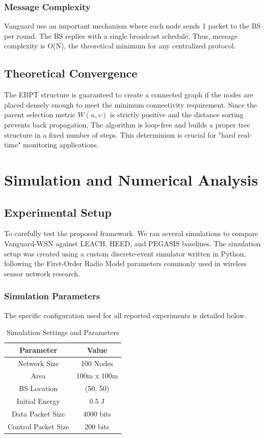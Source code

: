 \documentclass[conference]{IEEEtran}
\begin{document}
\subsubsection{Message Complexity}
Vanguard use an important mechanism where each node sends 1 packet to the BS per round. The BS replies with a single broadcast schedule. Thus, message complexity is O(N), the theoretical minimum for any centralized protocol.

\subsection{Theoretical Convergence}
The EBPT structure is guaranteed to create a connected graph if the nodes are placed densely enough to meet the minimum connectivity requirement. Since the parent selection metric $W(u, v)$ is strictly positive and the distance sorting prevents back propagation, The algorithm is loop-free and builds a proper tree structure in a fixed number of steps. This determinism is crucial for "hard real-time" monitoring applications.

\section{Simulation and Numerical Analysis}

\subsection{Experimental Setup}
To carefully test the proposed framework. We ran several simulations to compare Vanguard-WSN against LEACH, HEED, and PEGASIS baselines. The simulation setup was created using a custom discrete-event simulator written in Python, following the First-Order Radio Model parameters commonly used in wireless sensor network research.

\subsubsection{Simulation Parameters}
The specific configuration used for all reported experiments is detailed below.

\begin{table}[htbp]
\caption{Simulation Settings and Parameters}
\begin{center}
\begin{tabular}{|c|c|}
\hline
\textbf{Parameter} & \textbf{Value} \\
\hline
Network Size & 100 Nodes \\
Area & 100m x 100m \\
BS Location & (50, 50) \\
Initial Energy & 0.5 J \\
Data Packet Size & 4000 bits \\
Control Packet Size & 200 bits \\
\hline
\end{tabular}
\label{tab1}
\end{center}
\end{table}
\end{document}
